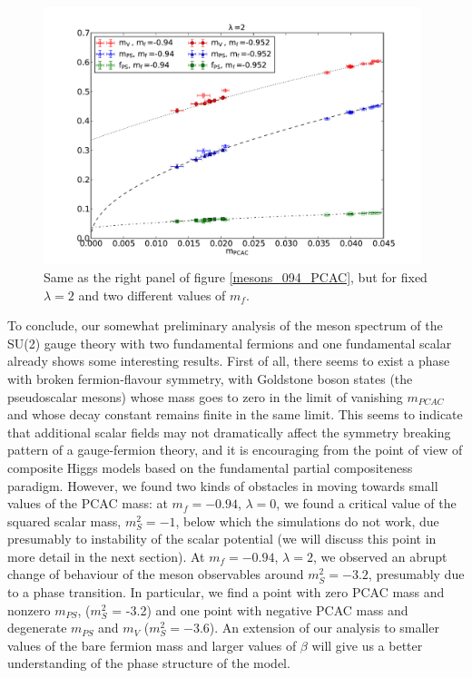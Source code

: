 \begin{figure}[t!] 
\begin{center}
 \includegraphics[width=11cm,clip]{pics/mesons_l2_PCAC_fit}
  \end{center}
  \caption{Same as the right panel of figure \ref{mesons_094_PCAC}, but for fixed $\lambda = 2$ and two different values of $m_f$.}
  \label{mesons_l2_PCAC}
\end{figure}

To conclude, our somewhat preliminary analysis of the meson spectrum of the SU(2) gauge theory with two fundamental fermions and one fundamental scalar already shows some interesting results. First of all, there seems to exist a phase with broken fermion-flavour symmetry, with Goldstone boson states (the pseudoscalar mesons) whose mass goes to zero in the limit of vanishing $m_{PCAC}$ and whose decay constant remains finite in the same limit. This seems to indicate that additional scalar fields may not dramatically affect the symmetry breaking pattern of a gauge-fermion theory, and it is encouraging from the point of view of composite Higgs models based on the fundamental partial compositeness paradigm. However, we found two kinds of obstacles in moving towards small values of the PCAC mass: at $m_f = -0.94$, $\lambda = 0$, we found a critical value of the squared scalar mass, $m_S^2 = -1$, below which the simulations do not work, due presumably to instability of the scalar potential (we will discuss this point in more detail in the next section). At $m_f = -0.94$, $\lambda = 2$, we observed an abrupt change of behaviour of the meson observables around $m_S^2 = -3.2$, presumably due to a phase transition. In particular, we find a point with zero PCAC mass and nonzero $m_{PS}$, ($m_S^2$ = -3.2) and one point with negative PCAC mass and degenerate $m_{PS}$ and $m_V$ ($m_S^2 = -3.6$). An extension of our analysis to smaller values of the bare fermion mass and larger values of $\beta$ will give us a better understanding of the phase structure of the model. 

